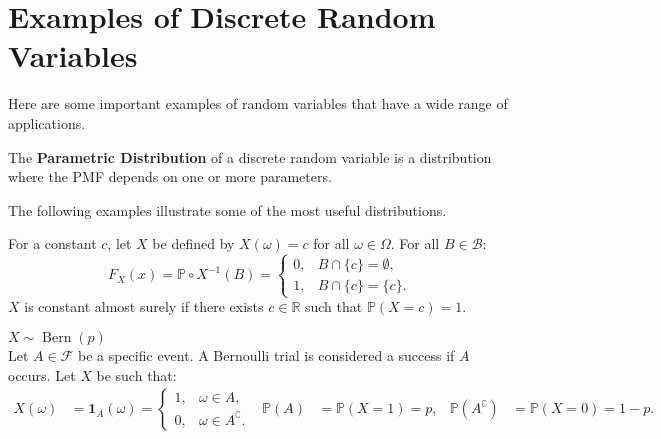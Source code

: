 \documentclass{huhtakm-template-book-v2}
\newcommand{\prob}{\mathbb{P}}
\DeclareMathOperator{\Bern}{Bern}
\begin{document}
\section{Examples of Discrete Random Variables}
    Here are some important examples of random variables that have a wide range of applications.
    \begin{defn}
        The \textbf{Parametric Distribution} of a discrete random variable is a distribution where the PMF depends on one or more parameters.
    \end{defn}
    The following examples illustrate some of the most useful distributions.
    \begin{eg}
        For a constant $c$, let $X$ be defined by $X(\omega) = c$ for all $\omega \in \Omega$. For all $B \in \mathcal{B}$:
        \begin{equation*}
            F_{X}(x) = \prob \circ X^{-1}(B) = \begin{cases}
                0, &B\cap\{c\} = \emptyset,\\
                1, &B\cap\{c\} = \{c\}.
            \end{cases}
        \end{equation*}
        $X$ is constant almost surely if there exists $c \in \mathbb{R}$ such that $\prob(X = c) = 1$.
    \end{eg}
    \begin{eg} $X \sim \Bern(p)$\\
        Let $A \in \mathcal{F}$ be a specific event. A Bernoulli trial is considered a success if $A$ occurs. Let $X$ be such that:
        \begin{align*}
            X(\omega) &= \mathbf{1}_{A}(\omega) = \begin{cases}
                1, &\omega \in A,\\
                0, &\omega \in A^{\complement}.
            \end{cases} & \prob(A) &= \prob(X = 1) = p, & \prob(A^{\complement}) &= \prob(X = 0) = 1-p.
        \end{align*}
    \end{eg}
\end{document}
